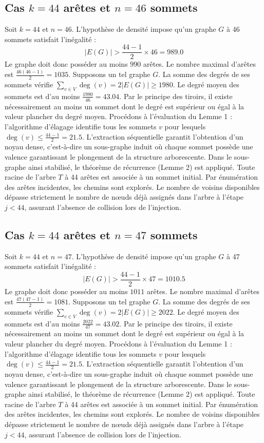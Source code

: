 \documentclass[12pt,a4paper]{article}
\begin{document}
\subsection{Cas $k = 44$ arêtes et $n = 46$ sommets}
Soit $k = 44$ et $n = 46$. L'hypothèse de densité impose qu'un graphe $G$ à 46 sommets satisfait l'inégalité :
$$ |E(G)| > \frac{44-1}{2} \times 46 = 989.0 $$
Le graphe doit donc posséder au moins $990$ arêtes. Le nombre maximal d'arêtes est $\frac{46(46-1)}{2} = 1035$.
Supposons un tel graphe $G$. La somme des degrés de ses sommets vérifie $\sum_{v \in V} \deg(v) = 2|E(G)| \geq 1980$.
Le degré moyen des sommets est d'au moins $\frac{1980}{46} = 43.04$.
Par le principe des tiroirs, il existe nécessairement au moins un sommet dont le degré est supérieur ou égal à la valeur plancher du degré moyen.
Procédons à l'évaluation du Lemme 1 : l'algorithme d'élagage identifie tous les sommets $v$ pour lesquels $\deg(v) \leq \frac{44-1}{2} = 21.5$.
L'extraction séquentielle garantit l'obtention d'un noyau dense, c'est-à-dire un sous-graphe induit où chaque sommet possède une valence garantissant le plongement de la structure arborescente.
Dans le sous-graphe ainsi stabilisé, le théorème de récurrence (Lemme 2) est appliqué. Toute racine de l'arbre $T$ à 44 arêtes est associée à un sommet initial. Par énumération des arêtes incidentes, les chemins sont explorés. Le nombre de voisins disponibles dépasse strictement le nombre de nœuds déjà assignés dans l'arbre à l'étape $j < 44$, assurant l'absence de collision lors de l'injection.

\subsection{Cas $k = 44$ arêtes et $n = 47$ sommets}
Soit $k = 44$ et $n = 47$. L'hypothèse de densité impose qu'un graphe $G$ à 47 sommets satisfait l'inégalité :
$$ |E(G)| > \frac{44-1}{2} \times 47 = 1010.5 $$
Le graphe doit donc posséder au moins $1011$ arêtes. Le nombre maximal d'arêtes est $\frac{47(47-1)}{2} = 1081$.
Supposons un tel graphe $G$. La somme des degrés de ses sommets vérifie $\sum_{v \in V} \deg(v) = 2|E(G)| \geq 2022$.
Le degré moyen des sommets est d'au moins $\frac{2022}{47} = 43.02$.
Par le principe des tiroirs, il existe nécessairement au moins un sommet dont le degré est supérieur ou égal à la valeur plancher du degré moyen.
Procédons à l'évaluation du Lemme 1 : l'algorithme d'élagage identifie tous les sommets $v$ pour lesquels $\deg(v) \leq \frac{44-1}{2} = 21.5$.
L'extraction séquentielle garantit l'obtention d'un noyau dense, c'est-à-dire un sous-graphe induit où chaque sommet possède une valence garantissant le plongement de la structure arborescente.
Dans le sous-graphe ainsi stabilisé, le théorème de récurrence (Lemme 2) est appliqué. Toute racine de l'arbre $T$ à 44 arêtes est associée à un sommet initial. Par énumération des arêtes incidentes, les chemins sont explorés. Le nombre de voisins disponibles dépasse strictement le nombre de nœuds déjà assignés dans l'arbre à l'étape $j < 44$, assurant l'absence de collision lors de l'injection.
\end{document}
